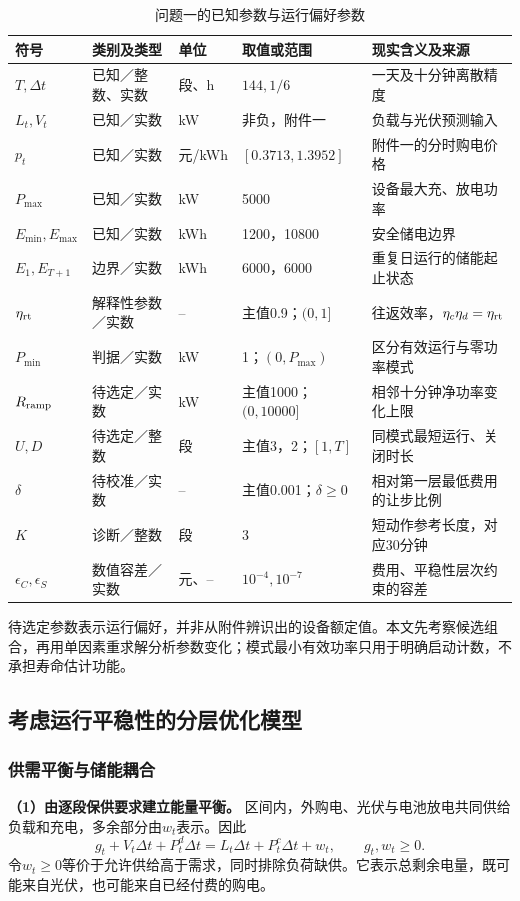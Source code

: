 \documentclass[withoutpreface,bwprint]{cumcmthesis}
\begin{document}
\begin{table}[htbp]
 \centering\small
 \caption{问题一的已知参数与运行偏好参数}\label{tab:q1-params}
 \renewcommand{\arraystretch}{1.12}
 \begin{tabularx}{\textwidth}{p{2.4cm}p{2.2cm}p{1.2cm}p{2.7cm}X}
 \toprule
 符号&类别及类型&单位&取值或范围&现实含义及来源\\
 \midrule
 $T,\Delta t$&已知／整数、实数&段、h&$144,1/6$&一天及十分钟离散精度\\
 $L_t,V_t$&已知／实数&kW&非负，附件一&负载与光伏预测输入\\
 $p_t$&已知／实数&元/kWh&$[0.3713,1.3952]$&附件一的分时购电价格\\
 $P_{\max}$&已知／实数&kW&5000&设备最大充、放电功率\\
 $E_{\min},E_{\max}$&已知／实数&kWh&1200，10800&安全储电边界\\
 $E_1,E_{T+1}$&边界／实数&kWh&6000，6000&重复日运行的储能起止状态\\
 $\eta_{\rm rt}$&解释性参数／实数&--&主值0.9；$(0,1]$&往返效率，$\eta_c\eta_d=\eta_{\rm rt}$\\
 $P_{\min}$&判据／实数&kW&1；$(0,P_{\max})$&区分有效运行与零功率模式\\
 $R_{\rm ramp}$&待选定／实数&kW&主值1000；$(0,10000]$&相邻十分钟净功率变化上限\\
 $U,D$&待选定／整数&段&主值3，2；$[1,T]$&同模式最短运行、关闭时长\\
 $\delta$&待校准／实数&--&主值0.001；$\delta\geq0$&相对第一层最低费用的让步比例\\
 $K$&诊断／整数&段&3&短动作参考长度，对应30分钟\\
 $\epsilon_C,\epsilon_S$&数值容差／实数&元、--&$10^{-4},10^{-7}$&费用、平稳性层次约束的容差\\
 \bottomrule
 \end{tabularx}
\end{table}
待选定参数表示运行偏好，并非从附件辨识出的设备额定值。本文先考察候选组合，再用单因素重求解分析参数变化；模式最小有效功率只用于明确启动计数，不承担寿命估计功能。

\subsection{考虑运行平稳性的分层优化模型}
\subsubsection{供需平衡与储能耦合}
\textbf{（1）由逐段保供要求建立能量平衡。}
区间内，外购电、光伏与电池放电共同供给负载和充电，多余部分由$w_t$表示。因此
\begin{equation}
 g_t+V_t\Delta t+P_t^d\Delta t
 =L_t\Delta t+P_t^c\Delta t+w_t,\qquad g_t,w_t\geq0 .
 \label{eq:q1-balance}
\end{equation}
令$w_t\geq0$等价于允许供给高于需求，同时排除负荷缺供。它表示总剩余电量，既可能来自光伏，也可能来自已经付费的购电。
\end{document}
